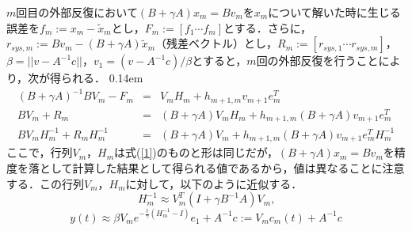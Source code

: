 \documentclass[a4paper,12pt]{nodlabpabw}
\newenvironment{Eqnarray}%
{\arraycolsep 0.14em\begin{eqnarray}}{\end{eqnarray}}
\begin{document}
$m$回目の外部反復において$(B+\gamma A)x_m=Bv_m$を$x_m$について解いた時に生じる誤差を$f_m:=x_m-\tilde{x}_m$とし，$F_m:=[f_1 \cdots f_m]$とする．さらに，$r_{sys,m}:=Bv_m-(B+\gamma A)\tilde{x}_m$（残差ベクトル）とし，$R_m:=[r_{sys,1}\cdots r_{sys,m}]$，$\beta=||v-A^{-1}c||$，$v_1=(v-A^{-1}c)/{\beta}$とすると，$m$回の外部反復を行うことにより，次が得られる．
\begin{Eqnarray}
(B+\gamma A)^{-1}BV_m-F_m&=&V_mH_m+h_{m+1,m}v_{m+1}e_m^T\label{9}\\
BV_m+R_m&=&(B+\gamma A)V_mH_m+h_{m+1,m}(B+\gamma A)v_{m+1}e_m^T\nonumber\\
BV_mH_m^{-1}+R_mH_m^{-1}&=&(B+\gamma A)V_m+h_{m+1,m}(B+\gamma A)v_{m+1}e_m^TH_m^{-1}\label{3}
\end{Eqnarray}
ここで，行列$V_m$，$H_m$は式(\ref{1})のものと形は同じだが，$(B+\gamma A)x_m=Bv_m$を精度を落として計算した結果として得られる値であるから，値は異なることに注意する．この行列$V_m$，$H_m$に対して，以下のように近似する．
\begin{equation}
H_m^{-1}\approx V_m^T(I+\gamma B^{-1}A)V_m\mbox{,}\label{5}
\end{equation}
\begin{equation}
y(t)\approx \beta V_me^{-\frac t{\gamma}(H_m^{-1}-I)}e_1+A^{-1}c:=V_mc_m(t)+A^{-1}c\label{6}
\end{equation}
\end{document}
